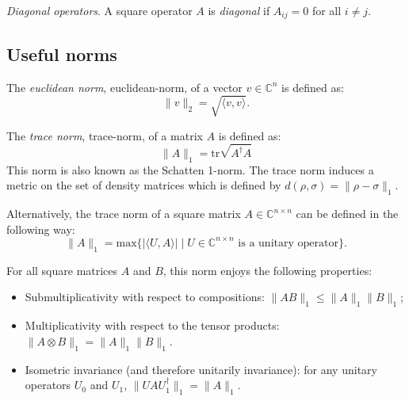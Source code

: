 \begin{definition}
  \emph{Diagonal operators}. A square operator $A$ is \emph{diagonal} if $A_{ij} = 0$ for all $i \neq j$.
\end{definition}


\subsection{Useful norms}

\begin{definition} \label{eq:euclidean_distance}
  The \emph{euclidean norm}, \gls{euclidean-norm}, of a vector $v \in \mathbb{C}^{n} $ is defined as:
  \begin{equation*}
    \lVert v \rVert_{2} = \sqrt{\langle v, v\rangle}. 
    \end{equation*}
\end{definition}

\begin{definition}\label{def:trace-norm-matriz}
  The \emph{trace norm}, \gls{trace-norm}, of a matrix $A$ is defined as:
  \begin{equation} \label{eq:trace_norm_matrix_tr}
    \lVert A \rVert_{1} = \text{tr} \sqrt{A^{\dagger}A}
  \end{equation}
  This norm is also  known as the Schatten 1-norm. The trace norm induces a metric on the set of density matrices which is defined by $d(\rho, \sigma) = \lVert \rho -\sigma\rVert_{1}$.
\end{definition}
Alternatively, the trace norm  of a square matrix $A \in \mathbb{C}^{n \times n} $ can be defined in the following way:
\begin{equation} \label{eq:trace_norm_matrix_U}
  \lVert A \rVert_{1} = \text{max} \{ |\langle U, A \rangle| \mid  U \in \mathbb{C}^{n \times n}   \text{ is a unitary operator}  \}.
\end{equation}


\begin{proposition} \label{prop:trace_norm_matrix}

  For all square matrices $A$ and $B$, this norm enjoys the following properties:
\begin{itemize}
  \item Submultiplicativity with respect to compositions: $\lVert AB \rVert_{1} \leq \lVert A \rVert_{1} \lVert B \rVert_{1}$;
  \item Multiplicativity with respect to the tensor products: $\lVert A \otimes B \rVert_{1} = \lVert A \rVert_{1} \lVert B \rVert_{1}$.
  \item Isometric invariance (and therefore unitarily invariance): for any unitary operators $U_0$ and $U_1$, $\lVert UAU_1^{\dagger} \rVert_{1} = \lVert A \rVert_{1}$.
\end{itemize}

\end{proposition}

